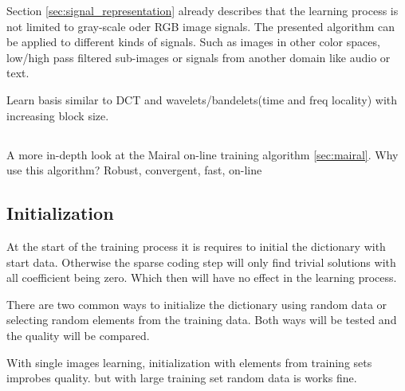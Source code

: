 Section \ref{sec:signal_representation} already describes that the learning
process is not limited to gray-scale oder RGB image signals. The presented
algorithm can be applied to different kinds of signals. Such as images in other
color spaces, low/high pass filtered sub-images or signals from another domain
like audio or text. 

Learn basis similar to DCT and wavelets/bandelets(time and freq locality) with
increasing block size.




\subsection{\trainDL}
A more in-depth look at the Mairal on-line training algorithm \ref{sec:mairal}. 
Why use this algorithm? Robust, convergent, fast, on-line



\subsection{Initialization}
At the start of the training process it is requires to initial the
dictionary with start data. Otherwise the sparse coding step will only find
trivial solutions with all coefficient being zero. Which then will have no
effect in the learning process.

There are two common ways to initialize the dictionary using random data or
selecting random elements from the training data. Both ways will be tested and 
the quality will be compared.


With single images learning, initialization with elements from training sets
improbes quality. but with large training set random data is works fine.



